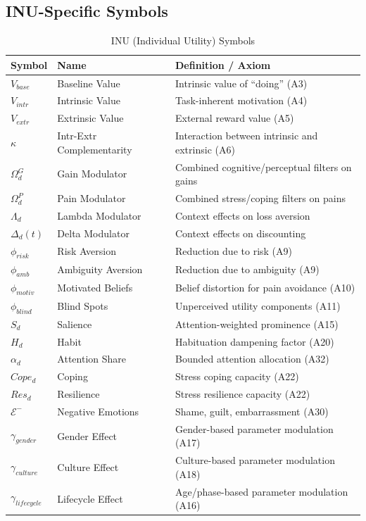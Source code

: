 \subsection{INU-Specific Symbols}

\begin{longtable}{@{}lp{4cm}p{7cm}@{}}
\caption{INU (Individual Utility) Symbols} \\
\toprule
\textbf{Symbol} & \textbf{Name} & \textbf{Definition / Axiom} \\
\midrule
\endfirsthead
\midrule
\endhead
\bottomrule
\endlastfoot

$V_{base}$ & Baseline Value & Intrinsic value of ``doing'' (A3) \\
$V_{intr}$ & Intrinsic Value & Task-inherent motivation (A4) \\
$V_{extr}$ & Extrinsic Value & External reward value (A5) \\
$\kappa$ & Intr-Extr Complementarity & Interaction between intrinsic and extrinsic (A6) \\
\addlinespace
$\Omega^G_d$ & Gain Modulator & Combined cognitive/perceptual filters on gains \\
$\Omega^P_d$ & Pain Modulator & Combined stress/coping filters on pains \\
$\Lambda_d$ & Lambda Modulator & Context effects on loss aversion \\
$\Delta_d(t)$ & Delta Modulator & Context effects on discounting \\
\addlinespace
$\phi_{risk}$ & Risk Aversion & Reduction due to risk (A9) \\
$\phi_{amb}$ & Ambiguity Aversion & Reduction due to ambiguity (A9) \\
$\phi_{motiv}$ & Motivated Beliefs & Belief distortion for pain avoidance (A10) \\
$\phi_{blind}$ & Blind Spots & Unperceived utility components (A11) \\
$S_d$ & Salience & Attention-weighted prominence (A15) \\
$H_d$ & Habit & Habituation dampening factor (A20) \\
$\alpha_d$ & Attention Share & Bounded attention allocation (A32) \\
\addlinespace
$Cope_d$ & Coping & Stress coping capacity (A22) \\
$Res_d$ & Resilience & Stress resilience capacity (A22) \\
$\mathcal{E}^-$ & Negative Emotions & Shame, guilt, embarrassment (A30) \\
\addlinespace
$\gamma_{gender}$ & Gender Effect & Gender-based parameter modulation (A17) \\
$\gamma_{culture}$ & Culture Effect & Culture-based parameter modulation (A18) \\
$\gamma_{lifecycle}$ & Lifecycle Effect & Age/phase-based parameter modulation (A16) \\

\end{longtable}

